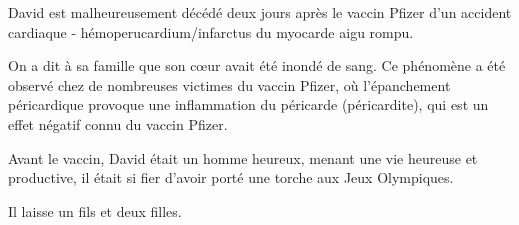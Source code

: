 David est malheureusement décédé deux jours après le vaccin Pfizer d'un accident
cardiaque - hémoperucardium/infarctus du myocarde aigu rompu.

On a dit à sa famille que son cœur avait été inondé de sang. Ce phénomène a été
observé chez de nombreuses victimes du vaccin Pfizer, où l'épanchement
péricardique provoque une inflammation du péricarde (péricardite), qui est un
effet négatif connu du vaccin Pfizer.

Avant le vaccin, David était un homme heureux, menant une vie heureuse et
productive, il était si fier d'avoir porté une torche aux Jeux Olympiques.

Il laisse un fils et deux filles.
